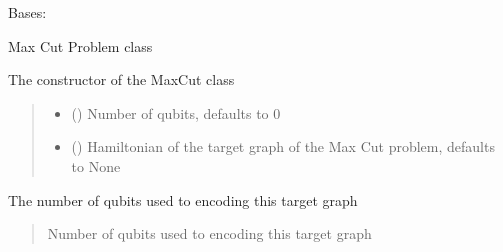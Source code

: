 \documentclass[letterpaper,10pt,english]{sphinxmanual}
\begin{document}
\begin{fulllineitems}
\label{\detokenize{qcompute_qapp.application.optimization:qcompute_qapp.application.optimization.MaxCut}}
\pysigstartsignatures
{}
\pysigstopsignatures
\sphinxAtStartPar
Bases: 

\sphinxAtStartPar
Max Cut Problem class

\sphinxAtStartPar
The constructor of the MaxCut class
\begin{quote}\begin{description}
\begin{itemize}
\item {} 
\sphinxAtStartPar
{} () \textendash{} Number of qubits, defaults to 0

\item {} 
\sphinxAtStartPar
{} () \textendash{} Hamiltonian of the target graph of the Max Cut problem, defaults to None

\end{itemize}

\end{description}\end{quote}

\begin{fulllineitems}
\label{\detokenize{qcompute_qapp.application.optimization:qcompute_qapp.application.optimization.MaxCut.num_qubits}}
\pysigstartsignatures
{}
\pysigstopsignatures
\sphinxAtStartPar
The number of qubits used to encoding this target graph
\begin{quote}\begin{description}
\sphinxAtStartPar
Number of qubits used to encoding this target graph


\end{description}
\end{quote}
\end{fulllineitems}
\end{fulllineitems}
\end{document}
